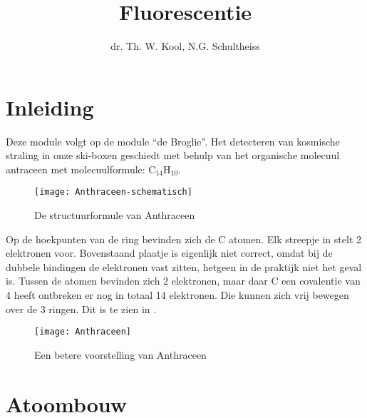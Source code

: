 



\title{Fluorescentie}
\author{dr. Th. W. Kool, N.G. Schultheiss}
\date{}

\maketitle
\thispagestyle{firststyle}

\section{Inleiding}

Deze module volgt op de module ``de Broglie''. Het detecteren van
kosmische straling in onze ski-boxen geschiedt met behulp van het
organische molecuul antraceen met molecuulformule: $\mathrm{C}_{14}\mathrm{H}_{10}$.

\begin{figure}[h]
\noindent \begin{centering}
\texttt{[image: Anthraceen-schematisch]}
\par\end{centering}

\caption{\label{fig:Structuurformule-Anthraceen}De structuurformule van Anthraceen}
\end{figure}


Op de hoekpunten van de ring bevinden zich de C atomen. Elk streepje
in  stelt 2 elektronen
voor. Bovenstaand plaatje is eigenlijk niet correct, omdat bij de
dubbele bindingen de elektronen vast zitten, hetgeen in de praktijk
niet het geval is. Tussen de atomen bevinden zich 2 elektronen, maar
daar C een covalentie van 4 heeft ontbreken er nog in totaal 14 elektronen.
Die kunnen zich vrij bewegen over de 3 ringen. Dit is te zien in
.

\begin{figure}[h]
\noindent \begin{centering}
\texttt{[image: Anthraceen]}
\par\end{centering}

\caption{\label{fig:Anthraceen2}Een betere voorstelling van Anthraceen}
\end{figure}


\section{Atoombouw}

